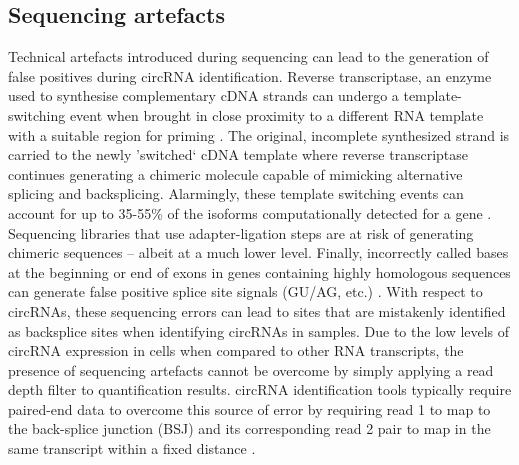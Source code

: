 \documentclass[journal,review,submit,pdftex,moreauthors]{Definitions/mdpi}
\begin{document}
\subsection{Sequencing artefacts}
Technical artefacts introduced during sequencing can lead to the generation of false positives during circRNA identification. Reverse transcriptase, an enzyme used to synthesise complementary cDNA strands can undergo a template-switching event when brought in close proximity to a different RNA template with a suitable region for priming \cite{Cocquet2006Jul}. The original, incomplete synthesized strand is carried to the newly 'switched` cDNA template where reverse transcriptase continues generating a chimeric molecule capable of mimicking alternative splicing and backsplicing. Alarmingly, these template switching events can account for up to 35-55\% of the isoforms computationally detected for a gene \cite{Roy2015}. Sequencing libraries that use adapter-ligation steps are at risk of generating chimeric sequences -- albeit at a much lower level. Finally, incorrectly called bases at the beginning or end of exons in genes containing highly homologous sequences can generate false positive splice site signals (GU/AG, etc.) \cite{Salzman2014Jun}. With respect to circRNAs, these sequencing errors can lead to sites that are mistakenly identified as backsplice sites when identifying circRNAs in samples. Due to the low levels of circRNA expression in cells when compared to other RNA transcripts, the presence of sequencing artefacts cannot be overcome by simply applying a read depth filter to quantification results. circRNA identification tools typically require paired-end data to overcome this source of error by requiring read 1 to map to the back-splice junction (BSJ) and its corresponding read 2 pair to map in the same transcript within a fixed distance \cite{Salzman2012}.
\end{document}
